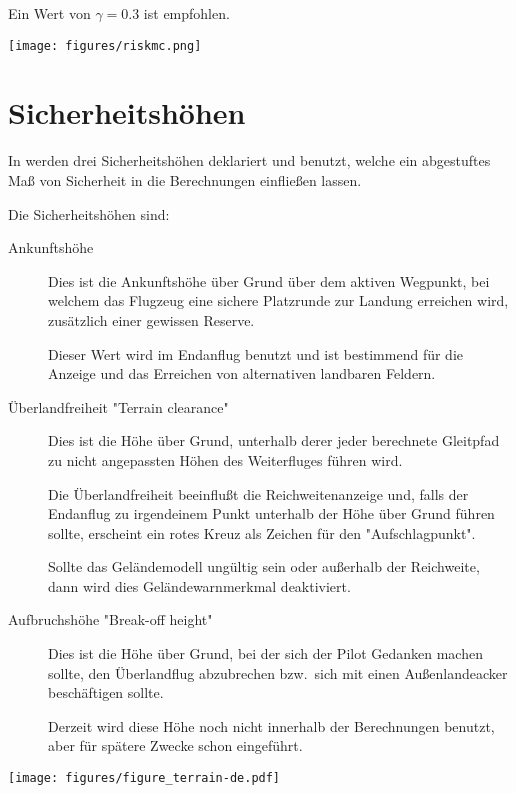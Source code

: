 Ein Wert von  $\gamma=0.3$ ist empfohlen.

\begin{center}
\texttt{[image: figures/riskmc.png]}
\end{center}

\section{Sicherheitshöhen}\label{sec:safety-heights}

In \xc werden drei Sicherheitshöhen deklariert und benutzt, welche ein abgestuftes Maß von Sicherheit in die Berechnungen einfließen lassen.

Die Sicherheitshöhen sind:
\begin{description}
\item[Ankunftshöhe]
Dies ist die Ankunftshöhe über Grund über dem aktiven Wegpunkt, bei welchem das Flugzeug  eine sichere Platzrunde
zur Landung erreichen wird, zusätzlich einer gewissen Reserve.

Dieser Wert wird im Endanflug benutzt und ist bestimmend für die Anzeige und das Erreichen von alternativen landbaren Feldern.


\item[Überlandfreiheit "Terrain  clearance"]
Dies ist die Höhe über Grund, unterhalb derer jeder berechnete Gleitpfad zu nicht
angepassten Höhen des Weiterfluges führen wird.

Die Überlandfreiheit beeinflußt die Reichweitenanzeige  und, falls der Endanflug zu irgendeinem
Punkt unterhalb der Höhe über Grund führen sollte, erscheint ein rotes Kreuz als Zeichen für den "Aufschlagpunkt".

Sollte das Geländemodell ungültig sein oder außerhalb der Reichweite, dann wird dies Geländewarnmerkmal deaktiviert.

\item[Aufbruchshöhe "Break-off height"]
Dies ist die Höhe über Grund, bei der sich der Pilot Gedanken machen sollte, den Überlandflug abzubrechen
bzw.\ sich mit einen Außenlandeacker beschäftigen sollte.

Derzeit wird diese Höhe noch nicht innerhalb der Berechnungen benutzt, aber für spätere Zwecke schon eingeführt.
\end{description}

\begin{maxipage}
\begin{center}
\texttt{[image: figures/figure\_terrain-de.pdf]}
\end{center}
\end{maxipage}


